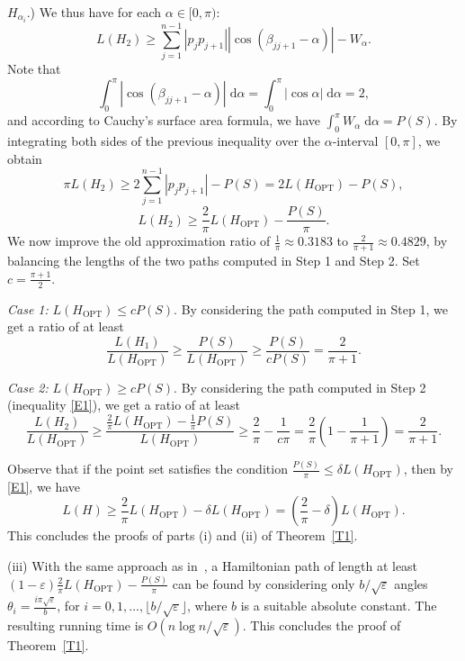 \documentclass[proceedings]{stacs}
\def\eps{\varepsilon}
\providecommand{\intd}[0]{\;\mbox{d}}
\begin{document}
$H_{\alpha_i}$.) We thus have for each $\alpha \in [0, \pi)$:
$$L(H_2) \geq \sum_{j=1}^{n-1} |p_{j} p_{j+1}|
|\cos(\beta_{j j+1}-\alpha)| -W_\alpha.$$
Note that
$$ \int_{0}^{\pi} |\cos(\beta_{j j+1}-\alpha)| \intd \alpha =
\int_{0}^{\pi} |\cos \alpha| \intd \alpha =2,$$
and according to Cauchy's surface area formula,
we have $\int_{0}^{\pi} W_\alpha \intd \alpha = P(S)$.
By integrating both sides of the previous inequality over the
$\alpha$-interval $[0,\pi]$, we obtain
$$ \pi L(H_2)
\geq 2 \sum_{j=1}^{n-1} |p_{j} p_{j+1}| -P(S)
= 2 L(H_\textrm{OPT}) -P(S), $$
\begin{equation} \label{E1}
L(H_2) \geq \frac{2}{\pi}L(H_\textrm{OPT})-\frac{P(S)}{\pi}.
\end{equation}
We now improve the old approximation ratio of $\frac{1}{\pi} \approx
0.3183$ to $\frac{2}{\pi+1} \approx 0.4829$, by
balancing the lengths of the two paths computed in {\sc Step 1} and
{\sc Step 2}. Set $c=\frac{\pi+1}{2}$.


\smallskip
{\em Case 1:} $L(H_\textrm{OPT}) \leq c P(S)$. By
considering the path computed in {\sc Step 1}, we get a ratio of
at least
$$ \frac{L(H_1)}{L(H_\textrm{OPT})} \geq
\frac{P(S)}{L(H_\textrm{OPT})} \geq \frac{P(S)}{cP(S)}= \frac{2}{\pi+1}. $$

\smallskip
{\em Case 2:} $L(H_\textrm{OPT}) \geq c P(S)$. By considering the path
computed in {\sc Step 2} (inequality \eqref{E1}), we get a ratio of at least
$$ \frac{L(H_2)}{L(H_\textrm{OPT})} \geq
\frac{\frac{2}{\pi} L(H_\textrm{OPT})-\frac{1}{\pi}P(S)}{L(H_\textrm{OPT})} \geq
\frac{2}{\pi} - \frac{1}{c\pi} = \frac{2}{\pi} \left(1- \frac{1}{\pi+1}\right) =
\frac{2}{\pi+1}. $$

\smallskip
Observe that if the point set satisfies the condition
$\frac{P(S)}{\pi} \leq \delta L(H_\textrm{OPT})$, then by \eqref{E1},
we have
$$
L(H) \geq \frac{2}{\pi} L(H_\textrm{OPT})- \delta L(H_\textrm{OPT}) =
\left(\frac{2}{\pi}-\delta \right) L(H_\textrm{OPT}).
$$
This concludes the proofs of parts (i) and (ii) of Theorem~\ref{T1}.

\smallskip
(iii) With the same approach as in~\cite{ARS95}, a Hamiltonian path of
length at least $(1-\eps)\frac{2}{\pi}L(H_\textrm{OPT})- \frac{P(S)}{\pi}$
can be found by considering only $b/\sqrt{\eps}$ angles
$\theta_i=\frac{i \pi \sqrt{\eps}}{b}$, for
$i=0,1,\ldots,\lfloor b/\sqrt{\eps} \rfloor$, where $b$ is a suitable
absolute constant. The resulting running time is $O(n \log{n}/\sqrt{\eps})$.
This concludes the proof of Theorem~\ref{T1}.
\end{document}
